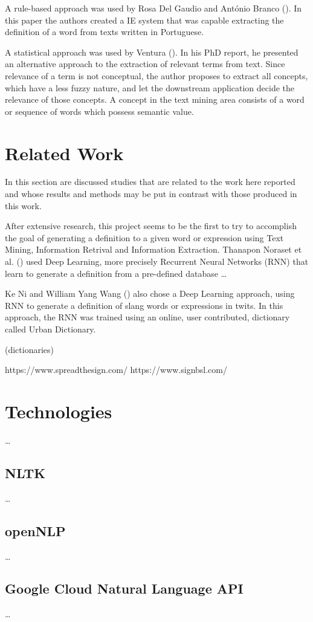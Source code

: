 A rule-based approach was used by Rosa Del Gaudio and António Branco (\citeyear{gaudio_2007}).
In this paper the authors created a IE system that was capable extracting the definition of a word from texts written in Portuguese.

A statistical approach was used by Ventura (\citeyear{ventura_2014}). 
In his PhD report, he presented an alternative approach to the extraction of relevant terms from text.
Since relevance of a term is not conceptual, the author proposes to extract all concepts, which have a less fuzzy nature, and let the downstream application decide the relevance of those concepts.
A concept in the text mining area consists of a word or sequence of words which possess semantic value.

\section{Related Work}

In this section are discussed studies that are related to the work here reported and whose results and methods may be put in contrast with those produced in this work.

After extensive research, this project seems to be the first to try to accomplish the goal of generating a definition to a given word or expression using Text Mining, Information Retrival and Information Extraction.
Thanapon Noraset et al. (\citeyear{noraset_2016}) used Deep Learning, more precisely Recurrent Neural Networks (RNN) that learn to generate a definition from a pre-defined database \dots

Ke Ni and William Yang Wang (\citeyear{ni_2017}) also chose a Deep Learning approach, using RNN to generate a definition of slang words or expressions in twits.
In this approach, the RNN was trained using an online, user contributed, dictionary called Urban Dictionary.

(dictionaries)

https://www.spreadthesign.com/
https://www.signbsl.com/

\section{Technologies}
\label{sec:technologies}

\dots

\subsection{NLTK}

\dots

\subsection{openNLP}

\dots

\subsection{Google Cloud Natural Language API}

\dots

